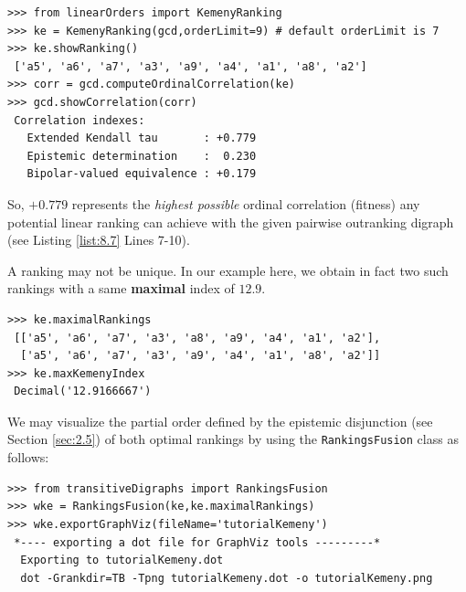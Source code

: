 \begin{lstlisting}[caption={Computing a \Kemeny ranking},label=list:8.7]   
>>> from linearOrders import KemenyRanking
>>> ke = KemenyRanking(gcd,orderLimit=9) # default orderLimit is 7
>>> ke.showRanking()
 ['a5', 'a6', 'a7', 'a3', 'a9', 'a4', 'a1', 'a8', 'a2']
>>> corr = gcd.computeOrdinalCorrelation(ke)
>>> gcd.showCorrelation(corr)
 Correlation indexes:
   Extended Kendall tau       : +0.779
   Epistemic determination    :  0.230
   Bipolar-valued equivalence : +0.179
\end{lstlisting}    

So, $+0.779$ represents the \emph{highest possible} ordinal correlation (fitness) any potential linear ranking can achieve with the given pairwise outranking digraph (see Listing \ref{list:8.7} Lines 7-10).

A \Kemeny ranking may not be unique. In our example here, we obtain in fact two such \Kemeny rankings with a same \textbf{maximal} \Kemeny index of $12.9$. 

\begin{lstlisting}[caption={Optimal \Kemeny rankings},label=list:8.8]   
>>> ke.maximalRankings
 [['a5', 'a6', 'a7', 'a3', 'a8', 'a9', 'a4', 'a1', 'a2'],
  ['a5', 'a6', 'a7', 'a3', 'a9', 'a4', 'a1', 'a8', 'a2']]
>>> ke.maxKemenyIndex
 Decimal('12.9166667')
\end{lstlisting}

We may visualize the partial order defined by the epistemic disjunction (see Section \ref{sec:2.5}) of both optimal \Kemeny rankings by using the \texttt{RankingsFusion} class as follows:

\begin{lstlisting}[caption={Computing the epistemic disjunction of all optimal \Kemeny rankings},label=list:8.9]   
>>> from transitiveDigraphs import RankingsFusion
>>> wke = RankingsFusion(ke,ke.maximalRankings)
>>> wke.exportGraphViz(fileName='tutorialKemeny')
 *---- exporting a dot file for GraphViz tools ---------*
  Exporting to tutorialKemeny.dot
  dot -Grankdir=TB -Tpng tutorialKemeny.dot -o tutorialKemeny.png
\end{lstlisting}

